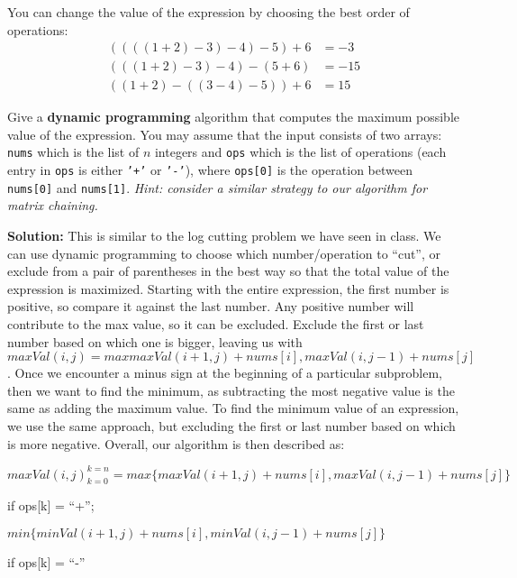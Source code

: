 \documentclass[10pt]{article}
\newcommand{\solution}[1]{\color{blue}\hfill\break\noindent\textbf{Solution:} #1\color{black}}
\begin{document}
You can change the value of the expression by choosing the best order of operations:
\begin{align*}
 ((((1 + 2) - 3) - 4) - 5) + 6 &= -3 \\
 (((1 + 2) - 3) - 4) - (5 + 6) &= -15\\
 ((1 + 2) - ((3 - 4) - 5)) + 6 &= 15
\end{align*}

Give a {\bf dynamic programming} algorithm that computes the maximum possible value of the expression. You may assume that
the input consists of two arrays: \texttt{nums} which is the list of $n$ integers and
\texttt{ops} which is the list of operations (each entry in \texttt{ops} is either \texttt{'+'}
or \texttt{'-'}), where \texttt{ops[0]} is the operation between \texttt{nums[0]} and \texttt{nums[1]}. \emph{Hint: consider a similar strategy to our algorithm for matrix chaining.}

    \solution{
    This is similar to the log cutting problem we have seen in class. We can use dynamic programming to choose which number/operation to “cut”, or exclude from a pair of parentheses in the best way so that the total value of the expression is maximized. Starting with the entire expression, the first number is positive, so compare it against the last number. Any positive number will contribute to the max value, so it can be excluded. Exclude the first or last number based on which one is bigger, leaving us with $maxVal(i, j) = max{maxVal(i+1, j) + nums[i], maxVal(i, j-1) + nums[j]}$. Once we encounter a minus sign at the beginning of a particular subproblem, then we want to find the minimum, as subtracting the most negative value is the same as adding the maximum value. To find the minimum value of an expression, we use the same approach, but excluding the first or last number based on which is more negative. Overall, our algorithm is then described as:
    
    \bigskip
    $maxVal(i, j)_{k=0}^{k=n} = max\{maxVal(i+1, j) + nums[i], maxVal(i, j-1) + nums[j]\}$ 
    
    if ops[k] = “+”;
    
    $min\{minVal(i+1, j) + nums[i], minVal(i, j-1) + nums[j]\}$
    
    if ops[k] = “-”

    }
  
\end{document}

